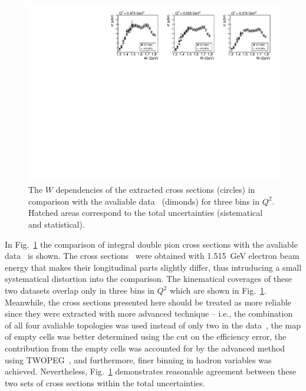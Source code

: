 \documentclass[prc,twocolumn,superscriptaddress,showpacs,amssymb,amsmath,amsfonts,linenumbers,aps]{revtex4-1}
\begin{document}
\begin{figure}[htp]
\begin{center}
\includegraphics[width=15cm]{pictures/conclusions/e1e_e1c.pdf}
\caption{\small The $W$ dependencies of the extracted  cross sections (circles) in comparison with the avaliable data~\cite{Fedotov:2008aa} (dimonds) for three bins in $Q^{2}$. Hatched areas correspond to the total uncertainties (sistematical and statistical).}
\label{fig:e1e_e1c}
\end{center}
\end{figure}


In Fig.~\ref{fig:e1e_e1c} the comparison of integral double pion cross sections with the avaliable data~\cite{Fedotov:2008aa} is shown. 
The cross sections~\cite{Fedotov:2008aa} were obtained with 1.515~GeV electron beam energy that makes their longitudinal parts slightly differ, thus intruducing a small systematical distortion into the comparison. The kinematical coverages of these two datasets overlap only in three bins in $Q^{2}$ which are shown in Fig.~\ref{fig:e1e_e1c}. Meanwhile, the cross sections presented here should be treated as more reliable since they were extracted with more advanced technique -- i.e., the combination of all four avaliable topologies was used instead of only two in the data~\cite{Fedotov:2008aa}, the map of empty cells was better determined using  the cut on the efficiency error, the contribution from the empty cells was accounted for by the advanced method using TWOPEG~\cite{Skorodum:EG}, and furthermore, finer binning in hadron variables was achieved. Nevertheless, Fig.~\ref{fig:e1e_e1c} demonstrates reasonable agreement between these two sets of cross sections within the total uncertainties.  
\end{document}

